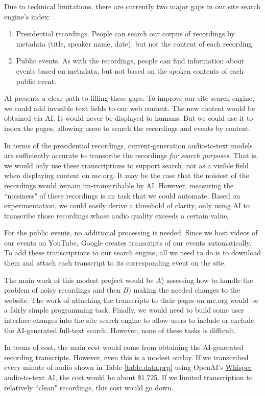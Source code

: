 \documentclass[12pt, oneside]{article}   	%
\begin{document}
Due to technical limitations, there are currently two major gaps in our site search engine's index:
\begin{enumerate}
\item Presidential recordings.  People can search our corpus of recordings by metadata (title, speaker name, date), but not the content of each recording.  
\item Public events.  As with the recordings, people can find information about events based on metadata, but not based on the spoken contents of each public event.
\end{enumerate}
AI presents a clear path to filling these gaps.  To improve our site search engine, we could add invisible text fields to our web content.  The new content would be obtained via AI.  It would never be displayed to humans.  But we could use it to index the pages, allowing users to search the recordings and events by content.

In terms of the presidential recordings, current-generation audio-to-text models are sufficiently accurate to transcribe the recordings \emph{for search purposes}.  That is, we would only use these transcriptions to support search, not as a visible field when displaying content on mc.org.  It may be the case that the noisiest of the recordings would remain un-transcribable by AI.  However, measuring the ``noisiness" of these recordings is an  task that we could automate.  Based on experimentation, we could easily derive a threshold of clarity, only using AI to transcribe those recordings whose audio quality exceeds a certain value.

For the public events, no additional processing is needed.  Since we host videos of our events on YouTube, Google creates transcripts of our events automatically.  To add these transcriptions to our search engine, all we need to do is to download them and attach each transcript to its corresponding event on the site.  

The main work of this modest project would be $A$) assessing how to handle the problem of noisy recordings and then $B$) making the needed changes to the website.  The work of attaching the transcripts to their pages on mc.org would be a fairly simple programming task.  Finally, we would need to build some user interface changes into the site search engine to allow users to include or exclude the AI-generated full-text search.  However, none of these tasks is difficult.

In terms of cost, the main cost would come from obtaining the AI-generated recording transcripts.  However, even this is a modest outlay.  If we transcribed every minute of audio shown in Table \ref{table.data.prp} using OpenAI's \href{https://openai.com/research/whisper}{Whisper} audio-to-text AI, the cost would be about \$1,725.  If we limited transcription to relatively ``clean" recordings, this cost would go down.
\end{document}
